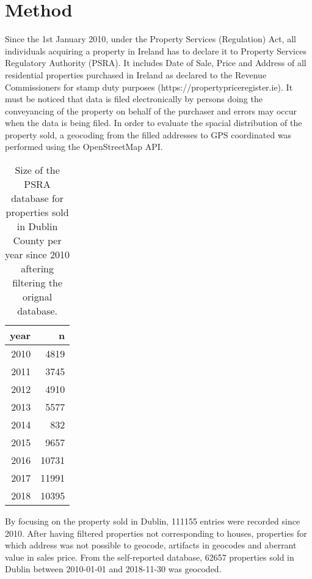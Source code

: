 \documentclass[]{elsarticle} %
\begin{document}
\section{Method}\label{method}

Since the 1st January 2010, under the Property Services (Regulation)
Act, all individuals acquiring a property in Ireland has to declare it
to Property Services Regulatory Authority (PSRA). It includes Date of
Sale, Price and Address of all residential properties purchased in
Ireland as declared to the Revenue Commissioners for stamp duty purposes
(https://propertypriceregister.ie). It must be noticed that data is
filed electronically by persons doing the conveyancing of the property
on behalf of the purchaser and errors may occur when the data is being
filed. In order to evaluate the spacial distribution of the property
sold, a geocoding from the filled addresses to GPS coordinated was
performed using the OpenStreetMap API.

\begin{table}[!h]

\caption{\label{tab:dublin-sample-size}Size of the PSRA database for properties sold in Dublin County per year since 2010 aftering filtering the orignal database.}
\centering
\fontsize{8}{10}\selectfont
\begin{tabular}{rr}
\toprule
year & n\\
\midrule
2010 & 4819\\
2011 & 3745\\
2012 & 4910\\
2013 & 5577\\
2014 & 832\\
2015 & 9657\\
2016 & 10731\\
2017 & 11991\\
2018 & 10395\\
\bottomrule
\end{tabular}
\end{table}

By focusing on the property sold in Dublin, 111155 entries were recorded
since 2010. After having filtered properties not corresponding to
houses, properties for which address was not possible to geocode,
artifacts in geocodes and aberrant value in sales price. From the
self-reported database, 62657 properties sold in Dublin between
2010-01-01 and 2018-11-30 was geocoded.
\end{document}
